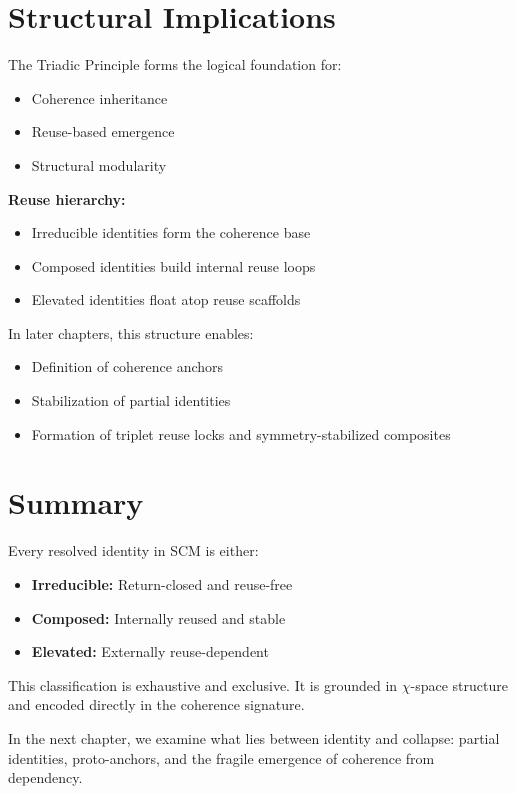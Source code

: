 \section{Structural Implications}

The Triadic Principle forms the logical foundation for:

\begin{itemize}
  \item Coherence inheritance
  \item Reuse-based emergence
  \item Structural modularity
\end{itemize}

\textbf{Reuse hierarchy:}
\begin{itemize}
  \item Irreducible identities form the coherence base
  \item Composed identities build internal reuse loops
  \item Elevated identities float atop reuse scaffolds
\end{itemize}

In later chapters, this structure enables:
\begin{itemize}
  \item Definition of coherence anchors
  \item Stabilization of partial identities
  \item Formation of triplet reuse locks and symmetry-stabilized composites
\end{itemize}

\section{Summary}

Every resolved identity in SCM is either:

\begin{itemize}
  \item \textbf{Irreducible:} Return-closed and reuse-free
  \item \textbf{Composed:} Internally reused and stable
  \item \textbf{Elevated:} Externally reuse-dependent
\end{itemize}

This classification is exhaustive and exclusive.  
It is grounded in $\chi$-space structure and encoded directly in the coherence signature.

In the next chapter, we examine what lies between identity and collapse:  
partial identities, proto-anchors, and the fragile emergence of coherence from dependency.
